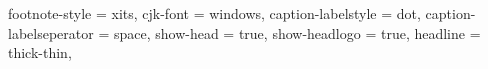 {{    footnote-style = xits,
    cjk-font = windows,
    caption-labelstyle = dot,
    caption-labelseperator = space,
    show-head = true,
    show-headlogo = true,
    headline = thick-thin,
}}
